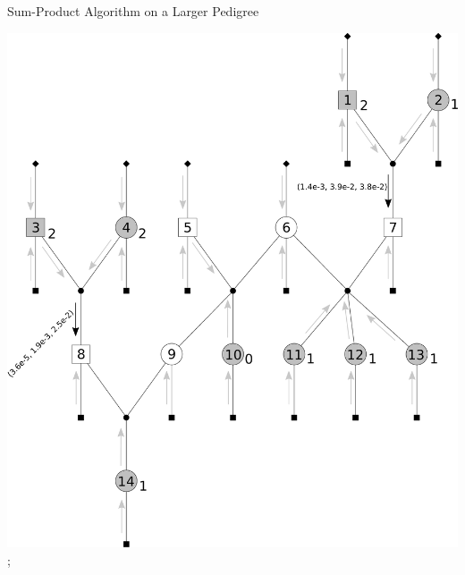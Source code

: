 \documentclass[letter,graphicx]{beamer}
\begin{document}
\begin{frame}{Sum-Product Algorithm on a Larger Pedigree} 
\begin{center} 
\includegraphics[height = 0.8\textheight]{./images/mg-example-step3.pdf}; 
\end{center}
\end{frame}
\end{document}

